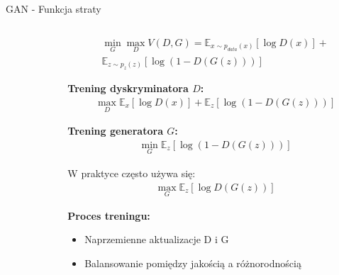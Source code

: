 \documentclass{beamer}
\begin{document}
\begin{frame}{GAN - Funkcja straty}
  \begin{columns}
    \begin{column}{0.5\textwidth}
    \end{column}
    \begin{column}{0.5\textwidth}
      \begin{tcolorbox}[colback=yellow!10!white, colframe=black!60, boxrule=0.5pt, arc=3mm]
        \begin{align*}
        \min_G \max_D V(D,G) = \mathbb{E}_{x \sim p_{data}(x)}[\log D(x)] + \\
        \mathbb{E}_{z \sim p_z(z)}[\log(1 - D(G(z)))]
        \end{align*}
      \end{tcolorbox}
      
      \textbf{Trening dyskryminatora $D$:} 
      \begin{align*}
        \max_D \mathbb{E}_{x}[\log D(x)] + \mathbb{E}_{z}[\log(1 - D(G(z)))]
      \end{align*}
      
      \textbf{Trening generatora $G$:} 
      \begin{align*}
        \min_G \mathbb{E}_{z}[\log(1 - D(G(z)))]
      \end{align*}
      
      W praktyce często używa się:
      \begin{align*}
        \max_G \mathbb{E}_{z}[\log D(G(z))]
      \end{align*}
      
      \medskip
      \textbf{Proces treningu:}
      \begin{itemize}
        \item Naprzemienne aktualizacje D i G
        \item Balansowanie pomiędzy jakością a różnorodnością
      \end{itemize}
    \end{column}
  \end{columns}
\end{frame}
\end{document}
